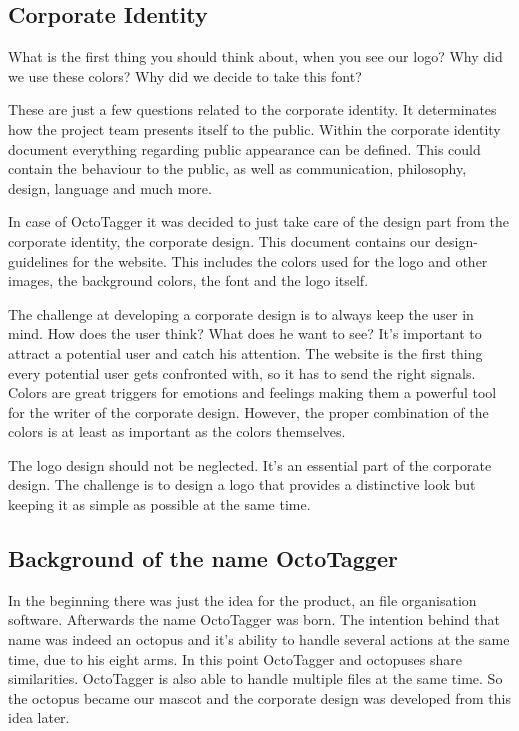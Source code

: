 \subsection{Corporate Identity}

What is the first thing you should think about, when you see our logo? Why did we use these colors? Why did we decide to take this font? 

These are just a few questions related to the corporate identity. It determinates how the project team presents itself to the public. Within the corporate identity document everything regarding public appearance can be defined. This could contain the behaviour to the public, as well as communication, philosophy, design, language and much more. 

In case of OctoTagger it was decided to just take care of the design part from the corporate identity, the corporate design. This document contains our design-guidelines for the website. This includes the colors used for the logo and other images, the background colors, the font and the logo itself. 

The challenge at developing a corporate design is to always keep the user in mind. How does the user think? What does he want to see? It's important to attract a potential user and catch his attention. The website is the first thing every potential user gets confronted with, so it has to send the right signals. Colors are great triggers for emotions and feelings making them a powerful tool for the writer of the corporate design. However, the proper combination of the colors is at least as important as the colors themselves. 

The logo design should not be neglected. It's an essential part of the corporate design. The challenge is to design a logo that provides a distinctive look but keeping it as simple as possible at the same time. 

\subsection{Background of the name OctoTagger}

In the beginning there was just the idea for the product, an file organisation software. Afterwards the name OctoTagger was born. The intention behind that name was indeed an octopus and it's ability to handle several actions at the same time, due to his eight arms. In this point OctoTagger and octopuses share similarities. OctoTagger is also able to handle multiple files at the same time. So the octopus became our mascot and the corporate design was developed from this idea later. 

